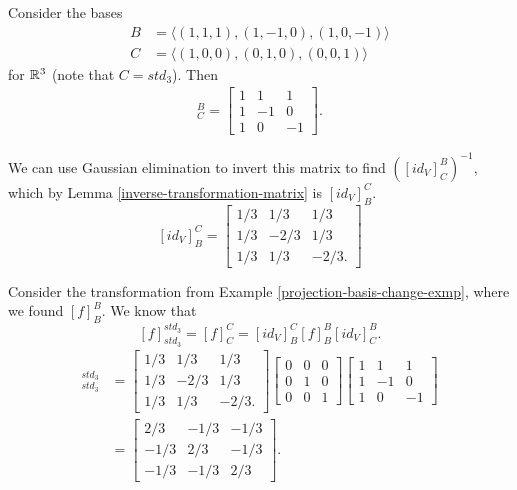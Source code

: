 \begin{exmp}
    Consider the bases
    \begin{align*}
        B &= \langle (1, 1, 1), (1, -1, 0), (1, 0, -1) \rangle \\
        C &= \langle (1, 0, 0), (0, 1, 0), (0, 0, 1) \rangle
    \end{align*}
    for $\mathbb{R}^3$ (note that $C = std_3$). Then
    \begin{align*}
        [id_V]_C^B = \begin{bmatrix}
            1 & 1 & 1 \\
            1 & -1 & 0 \\
            1 & 0 & -1
        \end{bmatrix}.
    \end{align*}

    We can use Gaussian elimination to invert this matrix to find $\left([id_V]_C^B\right)^{-1}$, which by Lemma \ref{inverse-transformation-matrix} is $[id_V]_B^C$.
    \[[id_V]_B^C = \begin{bmatrix}
        1/3 & 1/3 & 1/3 \\
        1/3 & -2/3 & 1/3 \\
        1/3 & 1/3 & -2/3.
    \end{bmatrix}\]

    Consider the transformation from Example \ref{projection-basis-change-exmp}, where we found $[f]_B^B$. We know that
    \[[f]_{std_3}^{std_3} = [f]_C^C = [id_V]_B^C[f]_B^B[id_V]_C^B.\]
    \begin{align*}
        [f]_{std_3}^{std_3} &= \begin{bmatrix}
            1/3 & 1/3 & 1/3 \\
            1/3 & -2/3 & 1/3 \\
            1/3 & 1/3 & -2/3.
        \end{bmatrix}\begin{bmatrix}
            0 & 0 & 0 \\
            0 & 1 & 0 \\
            0 & 0 & 1
        \end{bmatrix}\begin{bmatrix}
            1 & 1 & 1 \\
            1 & -1 & 0 \\
            1 & 0 & -1
        \end{bmatrix} \\
        &= \begin{bmatrix}
            2/3 & -1/3 & -1/3 \\
            -1/3 & 2/3 & -1/3 \\
            -1/3 & -1/3 & 2/3
        \end{bmatrix}.
    \end{align*}
\end{exmp}

